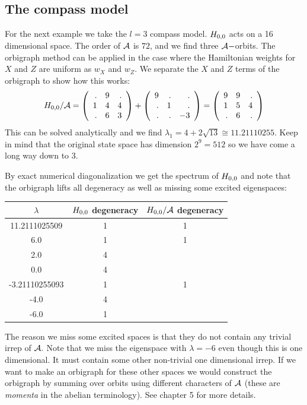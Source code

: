 \subsection{The compass model}
For the next example we take the $l=3$ compass model.
$H_{0,0}$ acts on a 16 dimensional space.
The order of $\mathcal{A}$ is $72$, and we find three $\mathcal{A}-$orbits.
The orbigraph method can be applied in the case
where the Hamiltonian weights for $X$ and $Z$ are uniform as $w_X$ and $w_Z.$
We separate the $X$ and $Z$ terms of the orbigraph to show
how this works:
$$
H_{0,0}/\mathcal{A} = 
\left(\begin{array}{rrr}
 . &  9 &  . \cr
  1 &  4 &  4 \cr
  . &  6 &  3
\end{array}\right) + 
\left(\begin{array}{rrr}
 9 &  . &  . \cr
  . &  1 &  . \cr
  . &  . &  -3
\end{array}\right)
=
\left(\begin{array}{rrr}
 9 &  9 &  . \cr
  1 &  5 &  4 \cr
  . &  6 &  .
\end{array}\right)
$$
This can be solved analytically and we find $\lambda_1 = 4+2\sqrt{13} \cong 11.21110255.$
Keep in mind that the original state space has dimension $2^9=512$ so we
have come a long way down to 3.

By exact %
numerical diagonalization
we get the spectrum of $H_{0,0}$ and note that the orbigraph lifts
all degeneracy as well as missing some excited eigenspaces:
\begin{center}
\begin{tabular}{ c|c|c } 
$\lambda$ & $H_{0,0}$ degeneracy & $H_{0,0}/\mathcal{A}$ degeneracy \\
\hline
    11.2111025509 & 1 & 1 \\
    6.0 & 1 & 1 \\
    2.0 & 4 &   \\
    0.0 & 4 &   \\
    -3.21110255093 & 1 & 1 \\
    -4.0 & 4 &   \\
    -6.0 & 1 &   
\end{tabular}
\end{center}
The reason we miss some excited spaces is that they do not contain
any trivial irrep of $\mathcal{A}.$
Note that we miss the eigenspace with $\lambda = -6$
even though this is one dimensional. It must contain some other non-trivial
one dimensional irrep. 
If we want to make an orbigraph for these other spaces we would construct
the orbigraph by
summing over orbits using different characters of $\mathcal{A}$
(these are \emph{momenta} in the abelian terminology).
See \cite{Cvetkovic1980} chapter 5 for more details.

